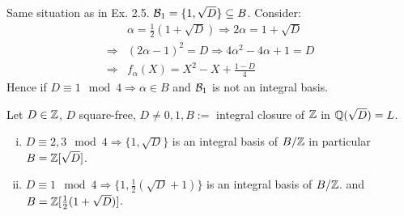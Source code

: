 \begin{Bsp}
Same situation as in Ex. 2.5. $\mathcal{B}_1=\{1, \sqrt{D}\} \subseteq B$. Consider:
\begin{align*}
&\alpha = \frac{1}{2}(1+ \sqrt{D}) \Rightarrow 2 \alpha = 1+ \sqrt{D}\\
\Rightarrow & (2\alpha-1)^2=D \Rightarrow 4 \alpha^2-4\alpha+1=D\\
\Rightarrow & f_\alpha(X)=X^2-X+\frac{1-D}{4}
\end{align*}
Hence if $D \equiv 1 \mod 4 \Rightarrow \alpha \in B$ and $\mathcal{B}_1$ is not an integral basis.
\end{Bsp}

\begin{Prop}
Let $D \in \mathbb{Z}$, $D$ square-free, $D \not = 0,1, B:= $ integral closure of $\mathbb{Z}$ in $\mathbb{Q}(\sqrt{D})=L$.
\begin{enumerate}[i)]
\item $D \equiv 2,3 \mod 4 \Rightarrow \{1, \sqrt{D}\}$ is an integral basis of $B / \mathbb{Z}$ in particular $B= \mathbb{Z}[\sqrt{D}]$.
\item $D \equiv 1 \mod 4 \Rightarrow \{1, \frac{1}{2}(\sqrt{D}+1)\}$ is an integral basis of $B / \mathbb{Z}$. and $B = \mathbb{Z}[\frac{1}{2} (1+\sqrt{D})]$.
\end{enumerate}
\end{Prop}

